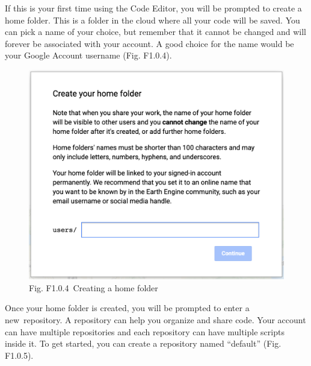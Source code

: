 \documentclass[
  letterpaper,
  DIV=11,
  numbers=noendperiod]{scrreprt}
\begin{document}
If this is your first time using the Code Editor, you will be prompted
to create a home folder. This is a folder in the cloud where all your
code will be saved. You can pick a name of your choice, but remember
that it cannot be changed and will forever be associated with your
account. A good choice for the name would be your Google Account
username (Fig. F1.0.4).

\begin{figure}

{\centering \includegraphics{./F1/image64.png}

}

\caption{Fig. F1.0.4~Creating a home folder}

\end{figure}

Once your home folder is created, you will be prompted to enter a
new~repository. A repository can help you organize and share code. Your
account can have multiple repositories and each repository can have
multiple scripts inside it. To get started, you can create a repository
named ``default'' (Fig. F1.0.5).
\end{document}
